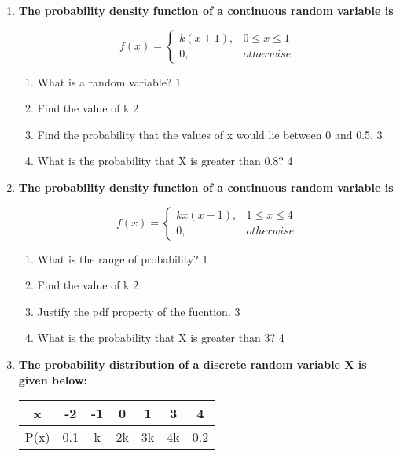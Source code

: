 \documentclass[a4paper,oneside, margin=1.4in]{book}
\begin{document}
\begin{enumerate}
  \item
  \textbf{The probability density function of a continuous random variable is}

$$
  f(x) =
\begin{cases}
k(x+1),  & 0 \le x \le 1 \\
0, & otherwise
\end{cases}
$$

  \begin{enumerate}
    \item
	What is a random variable? \hfill 1
    \item
    	Find the value of k \hfill 2
    \item
    	Find the probability that the values of x would lie between 0 and 0.5. \hfill 3
     \item
     	What is the probability that X is greater than 0.8?  \hfill 4
  \end{enumerate}
  
    \item
  \textbf{The probability density function of a continuous random variable is}

$$
  f(x) =
\begin{cases}
kx(x-1),  & 1 \le x \le 4 \\
0, & otherwise
\end{cases}
$$

  \begin{enumerate}
    \item
	What is the range of probability? \hfill 1
    \item
    	Find the value of k \hfill 2
    \item
    	Justify the pdf property of the fucntion. \hfill 3
     \item
     	What is the probability that X is greater than 3?  \hfill 4
  \end{enumerate}


 \item
	  \textbf{The probability distribution of a discrete random variable X is given below:} 

	  \begin{table}[h]
	  \begin{center}
\begin{tabular}{c|cccccc}
x    & -2   & -1 & 0   & 1 & 3 & 4   \\ \hline
P(x) & 0.1 & k & 2k & 3k & 4k & 0.2
\end{tabular} 
\end{center}	
\end{table}
  

\end{enumerate}
\end{document}
